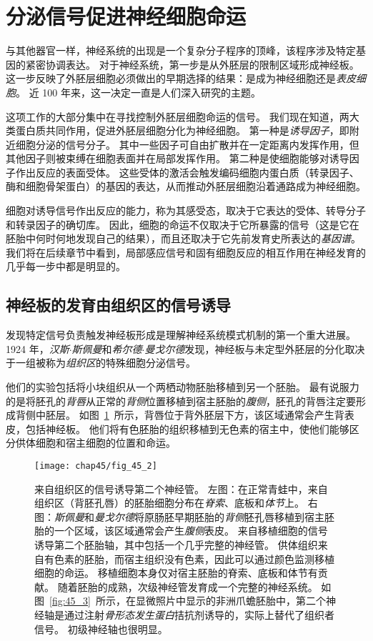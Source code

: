 \section{分泌信号促进神经细胞命运}

与其他器官一样，神经系统的出现是一个复杂分子程序的顶峰，该程序涉及特定基因的紧密协调表达。
对于神经系统，第一步是从外胚层的限制区域形成神经板。
这一步反映了外胚层细胞必须做出的早期选择的结果：是成为神经细胞还是\textit{表皮细胞}。
近 100 年来，这一决定一直是人们深入研究的主题。


这项工作的大部分集中在寻找控制外胚层细胞命运的信号。
我们现在知道，两大类蛋白质共同作用，促进外胚层细胞分化为神经细胞。
第一种是\textit{诱导因子}，即附近细胞分泌的信号分子。
其中一些因子可自由扩散并在一定距离内发挥作用，但其他因子则被束缚在细胞表面并在局部发挥作用。
第二种是使细胞能够对诱导因子作出反应的表面受体。
这些受体的激活会触发编码细胞内蛋白质（转录因子、酶和细胞骨架蛋白）的基因的表达，从而推动外胚层细胞沿着通路成为神经细胞。


细胞对诱导信号作出反应的能力，称为其感受态，取决于它表达的受体、转导分子和转录因子的确切库。
因此，细胞的命运不仅取决于它所暴露的信号（这是它在胚胎中何时何地发现自己的结果），而且还取决于它先前发育史所表达的\textit{基因谱}。
我们将在后续章节中看到，局部感应信号和固有细胞反应的相互作用在神经发育的几乎每一步中都是明显的。



\subsection{神经板的发育由组织区的信号诱导}

发现特定信号负责触发神经板形成是理解神经系统模式机制的第一个重大进展。
1924 年，\textit{汉斯$\cdot$斯佩曼}和\textit{希尔德$\cdot$曼戈尔德}发现，神经板与未定型外胚层的分化取决于一组被称为\textit{组织区}的特殊细胞分泌信号。


他们的实验包括将小块组织从一个两栖动物胚胎移植到另一个胚胎。
最有说服力的是将胚孔的\textit{背唇}从正常的\textit{背侧}位置移植到宿主胚胎的\textit{腹侧}，胚孔的背唇注定要形成背侧中胚层。
如图~\ref{fig:45_2}~所示，背唇位于背外胚层下方，该区域通常会产生背表皮，包括神经板。
他们将有色胚胎的组织移植到无色素的宿主中，使他们能够区分供体细胞和宿主细胞的位置和命运。


\begin{figure}[htbp]
	\centering
	\texttt{[image: chap45/fig\_45\_2]}
	\caption{来自组织区的信号诱导第二个神经管。
		左图：在正常青蛙中，来自组织区（背胚孔唇）的胚胎细胞分布在\textit{脊索}、底板和\textit{体节}上。
		右图：\textit{斯佩曼}和\textit{曼戈尔德}将原肠胚早期胚胎的\textit{背侧}胚孔唇移植到宿主胚胎的一个区域，该区域通常会产生\textit{腹侧}表皮。
		来自移植细胞的信号诱导第二个胚胎轴，其中包括一个几乎完整的神经管。
		供体组织来自有色素的胚胎，而宿主组织没有色素，因此可以通过颜色监测移植细胞的命运。
		移植细胞本身仅对宿主胚胎的脊索、底板和体节有贡献。
		随着胚胎的成熟，次级神经管发育成一个完整的神经系统。
		如图~\ref{fig:45_3}~所示，在显微照片中显示的非洲爪蟾胚胎中，第二个神经轴是通过注射\textit{骨形态发生蛋白}拮抗剂诱导的，实际上替代了组织者信号。
		初级神经轴也很明显。}
	\label{fig:45_2}
\end{figure}


